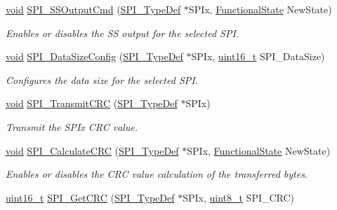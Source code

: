 \begin{DoxyCompactItemize}
\hyperlink{usb__devapi_8h_afabf60e7f57651d6d595a02c75f07cd0}{void} \hyperlink{group___s_p_i___exported___functions_ga4ec54abdedf6cd17403d853a926d91c1}{S\+P\+I\+\_\+\+S\+S\+Output\+Cmd} (\hyperlink{struct_s_p_i___type_def}{S\+P\+I\+\_\+\+Type\+Def} $\ast$S\+P\+Ix, \hyperlink{agilefox_2library_2inc_2stm32f10x__type_8h_ac9a7e9a35d2513ec15c3b537aaa4fba1}{Functional\+State} New\+State)
\begin{DoxyCompactList}\small\item\em Enables or disables the SS output for the selected S\+PI. \end{DoxyCompactList}\item 
\hyperlink{usb__devapi_8h_afabf60e7f57651d6d595a02c75f07cd0}{void} \hyperlink{group___s_p_i___exported___functions_gafc82e90841d7879535d655c035709cb1}{S\+P\+I\+\_\+\+Data\+Size\+Config} (\hyperlink{struct_s_p_i___type_def}{S\+P\+I\+\_\+\+Type\+Def} $\ast$S\+P\+Ix, \hyperlink{_p_e___types_8h_a1f1825b69244eb3ad2c7165ddc99c956}{uint16\+\_\+t} S\+P\+I\+\_\+\+Data\+Size)
\begin{DoxyCompactList}\small\item\em Configures the data size for the selected S\+PI. \end{DoxyCompactList}\item 
\hyperlink{usb__devapi_8h_afabf60e7f57651d6d595a02c75f07cd0}{void} \hyperlink{group___s_p_i___exported___functions_gace8b1058e09bab150b0dbe5978810273}{S\+P\+I\+\_\+\+Transmit\+C\+RC} (\hyperlink{struct_s_p_i___type_def}{S\+P\+I\+\_\+\+Type\+Def} $\ast$S\+P\+Ix)
\begin{DoxyCompactList}\small\item\em Transmit the S\+P\+Ix C\+RC value. \end{DoxyCompactList}\item 
\hyperlink{usb__devapi_8h_afabf60e7f57651d6d595a02c75f07cd0}{void} \hyperlink{group___s_p_i___exported___functions_ga64f7276d119e6cb58afc100f8832adb0}{S\+P\+I\+\_\+\+Calculate\+C\+RC} (\hyperlink{struct_s_p_i___type_def}{S\+P\+I\+\_\+\+Type\+Def} $\ast$S\+P\+Ix, \hyperlink{agilefox_2library_2inc_2stm32f10x__type_8h_ac9a7e9a35d2513ec15c3b537aaa4fba1}{Functional\+State} New\+State)
\begin{DoxyCompactList}\small\item\em Enables or disables the C\+RC value calculation of the transferred bytes. \end{DoxyCompactList}\item 
\hyperlink{_p_e___types_8h_a1f1825b69244eb3ad2c7165ddc99c956}{uint16\+\_\+t} \hyperlink{group___s_p_i___exported___functions_ga4c81c193516e82cf0a2fdc149ef20cc6}{S\+P\+I\+\_\+\+Get\+C\+RC} (\hyperlink{struct_s_p_i___type_def}{S\+P\+I\+\_\+\+Type\+Def} $\ast$S\+P\+Ix, \hyperlink{_p_e___types_8h_aba7bc1797add20fe3efdf37ced1182c5}{uint8\+\_\+t} S\+P\+I\+\_\+\+C\+RC)

\end{DoxyCompactItemize}

